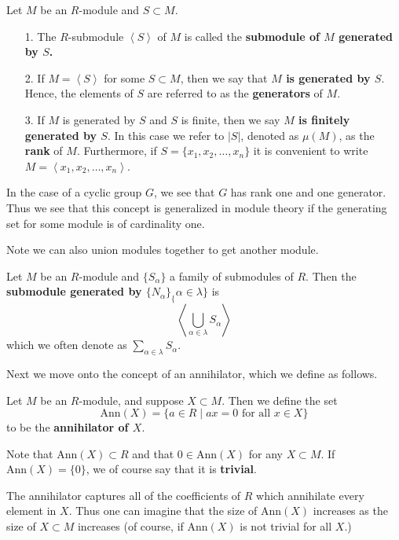 \documentclass[12pt,letterpaper]{algebra_book}
\newcommand{\ann}{\mbox{Ann}}
\theoremstyle{definition}
\begin{document}
\begin{definition}
    Let $M$ be an $R$-module and $S \subset M$.
    \begin{itemize}
        \item[1.] The $R$-submodule $\left< S \right>$ of $M$ is
        called the \textbf{submodule of $M$ generated by $S$.}
        \item[2.] If $M = \left< S \right>$ for some $S \subset M$, then we say that
        \textbf{$M$ is generated by $S$}. Hence, the elements of
        $S$ are referred to as the \textbf{generators} of $M$.
        \item[3.] If $M$ is generated by $S$ and $S$ is finite,
        then we say \textbf{$M$ is finitely generated by $S$}. In
        this case we refer to $|S|$, denoted as $\mu(M)$, as the
        \textbf{rank} of $M$. Furthermore, if $S = \{x_1, x_2,
        \dots, x_n\}$ it is convenient to write $M = \left< x_1,
        x_2, \dots, x_n \right>$.
    \end{itemize}
\end{definition}

In the case of a cyclic group $G$, we see that $G$ has rank one
and one generator. Thus we see that this concept is generalized in
module theory if the generating set for some module is of
cardinality one. 

Note we can also union modules together to get another module.
\begin{definition}
    Let $M$ be an $R$-module and $\{S_{\alpha}\}$ a family of
    submodules of $R$. Then the \textbf{submodule generated by
    $\{N_{\alpha}\}_\{\alpha \in \lambda\}$} is 
    \[
        \left< \bigcup_{\alpha \in \lambda}S_\alpha\right>
    \]
    which we often denote as $\displaystyle \sum_{\alpha \in \lambda}S_{\alpha}$.
\end{definition}

Next we move onto the concept of an annihilator, which we define
as follows. 

\begin{definition}
    Let $M$ be an $R$-module, and suppose $X \subset M$. Then we
    define the set 
    \[
        \ann(X) = \{a \in R \mid ax = 0 \text{ for all }x \in X\}
    \]
    to be the \textbf{annihilator of $X$}.
\end{definition}
\textcolor{NavyBlue}{Note that $\ann(X) \subset R$ and that
$0 \in \ann(X)$ for any $X \subset M$. If $\ann(X) = \{0\}$, we of
course say that it is \textbf{trivial}.}

The annihilator captures
all of the coefficients of $R$ which annihilate every element in
$X$. Thus one can imagine that the size of $\ann(X)$ increases as
the size of
$X \subset M$ increases (of course, if $\ann(X)$ is not trivial for all $X$.)
\end{document}
